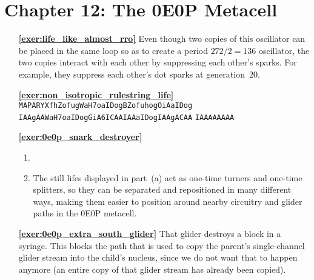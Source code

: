 


\hypertarget{solutions_0e0p}{}\label{solutions_0e0p}
\section*{Chapter 12: The 0E0P Metacell}
\renewcommand{\chapterfolder}{0e0p/}

\begin{multicols}{2}
	\begin{itemize}[leftmargin=0em]
		\item[\bf\color{ocre}\sffamily\ref{exer:life_like_almost_rro}] Even though two copies of this oscillator can be placed in the same loop so as to create a period $272/2 = 136$ oscillator, the two copies interact with each other by suppressing each other's sparks. For example, they suppress each other's dot sparks at generation~$20$.\\
		
		
		\item[\bf\color{ocre}\sffamily\ref{exer:non_isotropic_rulestring_life}] \texttt{MAPARYXfhZofugWaH7oaIDogBZofuhogOiAaIDog} \texttt{IAAgAAWaH7oaIDogGiA6ICAAIAAaIDogIAAgACAA} \texttt{IAAAAAAAA}\\
		
		
		\item[\bf\color{ocre}\sffamily\ref{exer:0e0p_snark_destroyer}] \begin{enumerate}[leftmargin=1.5em,label=\bf\color{ocre}(\alph*)]
			\item {} \\
			
			\item The still lifes displayed in part~(a) act as one-time turners and one-time splitters, so they can be separated and repositioned in many different ways, making them easier to position around nearby circuitry and glider paths in the 0E0P metacell.\\
		\end{enumerate}
	
	
		\item[\bf\color{ocre}\sffamily\ref{exer:0e0p_extra_south_glider}] That glider destroys a block in a syringe. This blocks the path that is used to copy the parent's single-channel glider stream into the child's nucleus, since we do not want that to happen anymore (an entire copy of that glider stream has already been copied).\\
		

\end{itemize}
\end{multicols}
